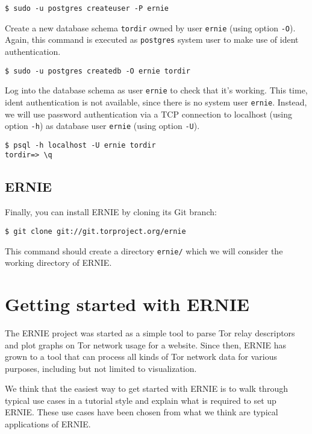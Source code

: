 \documentclass{article}
\begin{document}
\begin{verbatim}
$ sudo -u postgres createuser -P ernie
\end{verbatim}

Create a new database schema \verb+tordir+ owned by user \verb+ernie+
(using option \verb+-O+).
Again, this command is executed as \verb+postgres+ system user to make use
of ident authentication.

\begin{verbatim}
$ sudo -u postgres createdb -O ernie tordir
\end{verbatim}

Log into the database schema as user \verb+ernie+ to check that it's
working.
This time, ident authentication is not available, since there is no system
user \verb+ernie+.
Instead, we will use password authentication via a TCP connection to
localhost (using option \verb+-h+) as database user \verb+ernie+ (using
option \verb+-U+).

\begin{verbatim}
$ psql -h localhost -U ernie tordir
tordir=> \q
\end{verbatim}

\subsection{ERNIE}

Finally, you can install ERNIE by cloning its Git branch: 

\begin{verbatim}
$ git clone git://git.torproject.org/ernie
\end{verbatim}

This command should create a directory \verb+ernie/+ which we will
consider the working directory of ERNIE.

\section{Getting started with ERNIE}

The ERNIE project was started as a simple tool to parse Tor relay
descriptors and plot graphs on Tor network usage for a website.
Since then, ERNIE has grown to a tool that can process all kinds of Tor
network data for various purposes, including but not limited to
visualization.

We think that the easiest way to get started with ERNIE is to walk through
typical use cases in a tutorial style and explain what is required to set
up ERNIE.
These use cases have been chosen from what we think are typical
applications of ERNIE.
\end{document}
